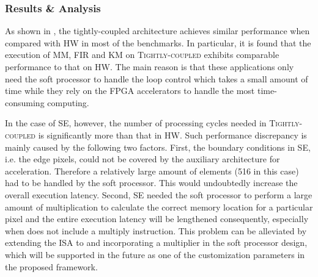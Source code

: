 \subsubsection{Results \& Analysis}

As shown in , the tightly-coupled architecture achieves similar performance when compared with \textsc{HW} in most of the benchmarks. In particular, it is found that the execution of MM, FIR and KM on \textsc{Tightly-coupled} exhibits comparable performance to that on \textsc{HW}. The main reason is that these applications only need the soft processor to handle the loop control which takes a small amount of time while they rely on the FPGA accelerators to handle the most time-consuming computing.
 

In the case of SE, however, the number of processing cycles needed in \textsc{Tightly-coupled} is significantly more than that in \textsc{HW}. Such performance discrepancy is mainly caused by the following two factors. First, the boundary conditions in SE, i.e. the edge pixels, could not be covered by the auxiliary architecture for acceleration. Therefore a relatively large amount of elements (516 in this case) had to be handled by the soft processor. This would undoubtedly increase the overall execution latency. Second, SE needed the soft processor to perform a large amount of multiplication to calculate the correct memory location for a particular pixel and the entire execution latency will be lengthened consequently, especially when  does not include a multiply instruction. This problem can be alleviated by extending the ISA to  and incorporating a multiplier in the soft processor design, which will be supported in the future as one of the customization parameters in the proposed framework.



